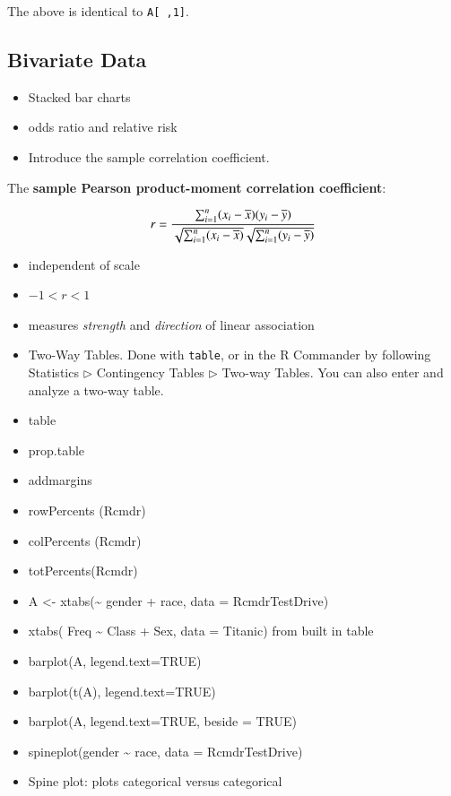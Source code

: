 \documentclass[captions=tableheading]{scrbook}
\begin{document}
The above is identical to \texttt{A[ ,1]}. 
\subsection{Bivariate Data}
\label{sec-2-5-1}

\label{sub:Bivariate-Data}

\begin{itemize}
\item Stacked bar charts
\item odds ratio and relative risk
\item Introduce the sample correlation coefficient.
\end{itemize}

The \textbf{sample Pearson product-moment correlation coefficient}:

\[
r=\frac{\sum_{i=1}^{n}(x_{i}-\overline{x})(y_{i}-\overline{y})}{\sqrt{\sum_{i=1}^{n}(x_{i}-\overline{x})}\sqrt{\sum_{i=1}^{n}(y_{i}-\overline{y})}}
\]

\begin{itemize}
\item independent of scale
\item \(-1<r<1\)
\item measures \emph{strength} and \emph{direction} of linear association
\item Two-Way Tables. Done with \texttt{table}, or in the \textsf{R} Commander by following \textsf{Statistics \(\triangleright\) Contingency Tables \(\triangleright\)} \textsf{Two-way Tables}. You can also enter and analyze a two-way table.
\end{itemize}


\begin{itemize}
\item table
\item prop.table
\item addmargins
\item rowPercents (Rcmdr)
\item colPercents (Rcmdr)
\item totPercents(Rcmdr)
\item A <- xtabs(\~{} gender + race, data = RcmdrTestDrive)
\item xtabs( Freq \~{} Class + Sex, data = Titanic) from built in table
\item barplot(A, legend.text=TRUE)
\item barplot(t(A), legend.text=TRUE)
\item barplot(A, legend.text=TRUE, beside = TRUE)
\item spineplot(gender \~{} race, data = RcmdrTestDrive)
\item Spine plot: plots categorical versus categorical
\end{itemize}
\end{document}
